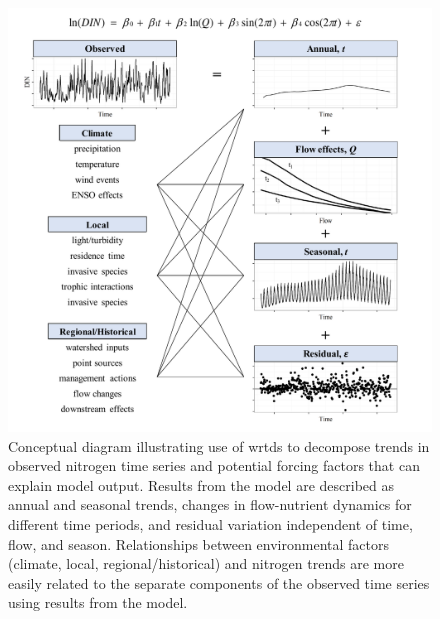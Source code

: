 \documentclass[letterpaper,12pt,oneside]{article}\usepackage[]{graphicx}\usepackage[]{color}
\begin{document}
\clearpage
\begin{singlespace}


\end{singlespace}
\clearpage

\begin{figure}
\centering
\includegraphics[width=1\textwidth,page=1]{figs/schematic.pdf}
\caption{Conceptual diagram illustrating use of \ac{wrtds} to decompose trends in observed nitrogen time series and potential forcing factors that can explain model output.  Results from the model are described as annual and seasonal trends, changes in flow-nutrient dynamics for different time periods, and residual variation independent of time, flow, and season. Relationships between environmental factors (climate, local, regional/historical) and nitrogen trends are more easily related to the separate components of the observed time series using results from the model. }
\label{fig:schematic}   
\end{figure}
\end{document}
